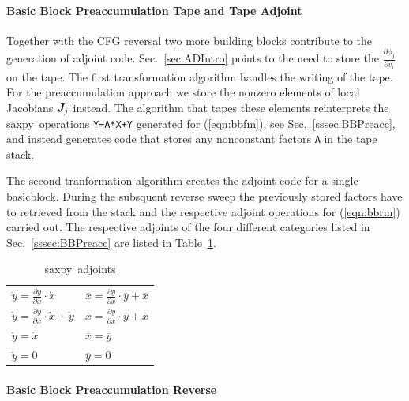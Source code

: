 \documentclass[11pt]{article}
\newcommand{\basicblock}{basicblock}
\newcommand{\saxpy}{saxpy}
\newcommand{\bmJ}{\mbox{\bf\em J}}
\newcommand{\code}[1]{{\small\tt{#1}}}
\newcommand{\refsec}[1]{{Sec.~\ref{#1}}}
\newcommand{\reftab}[1]{{Table~\ref{#1}}}
\newcommand{\refeqn}[1]{{(\ref{#1})}}
\begin{document}
\paragraph{Basic Block Preaccumulation Tape and Tape Adjoint}\label{sssec:bbTA}

Together with the CFG reversal two more building blocks contribute to the 
generation of adjoint code. 
\refsec{sec:ADIntro} points to the need to store the $\frac{\partial \phi_j}{\partial v_i}$ on the tape. 
The first transformation algorithm handles the writing of the tape.
For the preaccumulation approach we store the nonzero elements of local
Jacobians $\bmJ_j$ instead. The algorithm that tapes these elements reinterprets
the \saxpy\ operations \code{Y=A*X+Y} generated for \refeqn{eqn:bbfm}, see \refsec{sssec:BBPreacc}, 
and instead generates code that stores any nonconstant factors \code{A} in the tape stack. 

The second tranformation algorithm creates the adjoint code for a single \basicblock.
During the subsquent reverse sweep the previously stored factors have to retrieved from the stack and 
the respective adjoint operations for \refeqn{eqn:bbrm} carried out. 
The respective adjoints of the four different categories listed in \refsec{sssec:BBPreacc} are listed in 
\reftab{tab:saxpyAdj}.
\begin{table}
\begin{tabular}{|l|l|}\hline
$\dot{y} = \frac{\partial y }{\partial x }\cdot \dot{x}$ &  $\overline{x} = \frac{\partial y }{\partial x }\cdot \overline{y} + \overline{x}$ \\
$\dot{y} = \frac{\partial y }{\partial x }\cdot \dot{x} + \dot{y}$ & $\overline{x} = \frac{\partial y }{\partial x }\cdot \overline{y} + \overline{x}$ \\
$\dot{y} = \dot{x}$ 					& $\overline{x} = \overline{y}$ \\
$\dot{y} = 0$ 						& $\overline{y} = 0$ 
\end{tabular}
\caption{\saxpy\ adjoints} \label{tab:saxpyAdj}
\end{table} 



\paragraph{Basic Block Preaccumulation Reverse}\label{sssec:BBRev}
\end{document}
